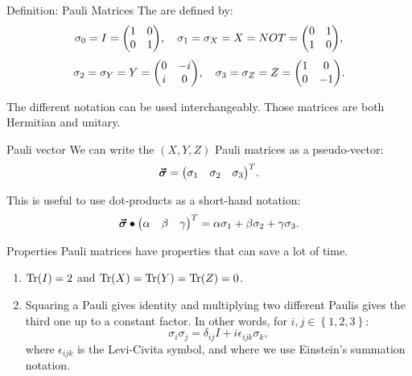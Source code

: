 \documentclass[a4paper]{article}
\begin{document}
\begin{parag}{Definition: Pauli Matrices}
    The  are defined by: 
    \[\sigma_0 = I = \begin{pmatrix} 1 & 0 \\ 0 & 1 \end{pmatrix}, \mathspace \sigma_1 = \sigma_X = X = NOT = \begin{pmatrix} 0 & 1 \\ 1 & 0 \end{pmatrix},\]
    \[\sigma_2 = \sigma_Y = Y = \begin{pmatrix} 0 & -i \\ i & 0 \end{pmatrix}, \mathspace \sigma_3 = \sigma_Z = Z = \begin{pmatrix} 1 & 0 \\ 0 & -1 \end{pmatrix}.\]
    
    The different notation can be used interchangeably. Those matrices are both Hermitian and unitary.

    \begin{subparag}{Pauli vector}
        We can write the $\left(X, Y, Z\right)$ Pauli matrices as a pseudo-vector: 
        \[\bvec{\sigma} = \begin{pmatrix} \sigma_1 & \sigma_2 & \sigma_3 \end{pmatrix}^T.\]

        This is useful to use dot-products as a short-hand notation: 
        \[\bm{\protect\vec{\sigma}} \bullet \begin{pmatrix} \alpha & \beta & \gamma \end{pmatrix}^T = \alpha \sigma_1 + \beta \sigma_2 + \gamma \sigma_3.\]
    \end{subparag}

    \begin{subparag}{Properties}
        Pauli matrices have properties that can save a lot of time.
        \begin{enumerate}[left=0pt]
            \item $\Tr\left(I\right) = 2$ and $\Tr\left(X\right) = \Tr\left(Y\right) = \Tr\left(Z\right) = 0$.
            \item Squaring a Pauli gives identity and multiplying two different Paulis gives the third one up to a constant factor. In other words, for $i,j \in \left\{1, 2, 3\right\}$: 
            \[\sigma_i \sigma_j = \delta_{ij} I + i \epsilon_{ijk} \sigma_k,\]
            where $\epsilon_{ijk}$ is the Levi-Civita symbol, and where we use Einstein's summation notation.
            

\end{enumerate}
\end{subparag}
\end{parag}
\end{document}
